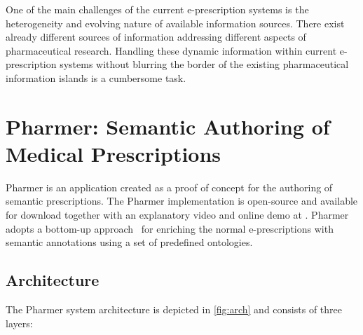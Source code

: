\documentclass[10pt, conference, compsocconf]{IEEEtran}
\begin{document}
One of the main challenges of the current e-prescription systems is the heterogeneity and evolving nature of available information sources.
There exist already different sources of information addressing different aspects of pharmaceutical research.
Handling these dynamic information within current e-prescription systems without blurring the border of the existing pharmaceutical information islands is a cumbersome task.

\section{Pharmer: Semantic Authoring of Medical Prescriptions}
\label{sec:pharmer}
Pharmer is an application created as a proof of concept for the authoring of semantic prescriptions.
The Pharmer implementation is open-source and available for download together with an explanatory video and online demo at \cite{pharmerproject}.
Pharmer adopts a bottom-up approach~\cite{khalili2012} for enriching the normal e-prescriptions with semantic annotations using a set of predefined ontologies.




\subsection{Architecture}

The Pharmer system architecture is depicted in \autoref{fig:arch} and consists of three layers:
\end{document}
